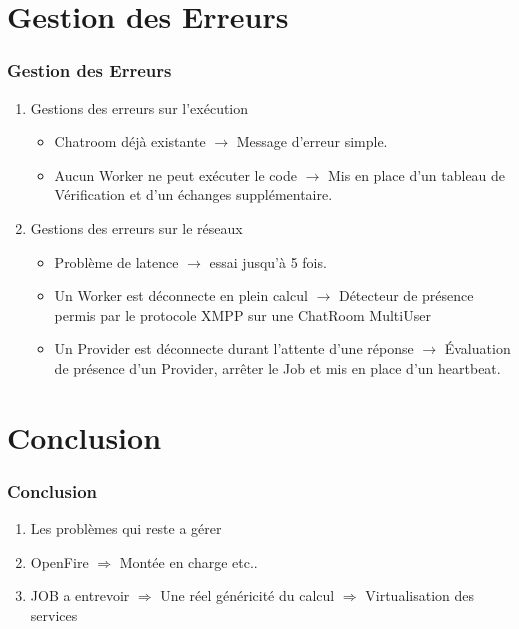 \documentclass[slidetop,11pt]{beamer}
\begin{document}
\section[Gestion des Erreurs]{Gestion des Erreurs}
\begin{frame}[label=Gestion des Erreurs]
\frametitle{Gestion des Erreurs}
\begin{enumerate}
\item Gestions des erreurs sur l\textquoteright exécution
	\begin{itemize}
	\item Chatroom déjà existante $\rightarrow$ Message d'erreur simple.
	\item Aucun Worker ne peut exécuter le code $\rightarrow$ Mis en place d'un tableau de Vérification et d'un échanges supplémentaire. 
	\end{itemize}
\item Gestions des erreurs sur le réseaux
	\begin{itemize}
	\item Problème de latence $\rightarrow$ essai jusqu’à 5 fois.
	\item Un Worker est déconnecte en plein calcul $ \rightarrow $ Détecteur de présence permis par le protocole XMPP sur une ChatRoom MultiUser
	\item Un Provider est déconnecte durant l'attente d'une réponse \newline $ \rightarrow $ Évaluation de présence d'un Provider, arrêter le Job et mis en place d'un heartbeat.
	
	\end{itemize}
\end{enumerate}

\end{frame}

\section[Conclusion]{Conclusion}
\begin{frame}[label=conclusion]
\frametitle{Conclusion}
\begin{enumerate}
\item Les problèmes qui reste a gérer
\item OpenFire $\Rightarrow$ Montée en charge etc..
\item JOB a entrevoir $\Rightarrow$ Une réel généricité du calcul $\Rightarrow$ Virtualisation des services
\end{enumerate}
\end{frame}
\end{document}
